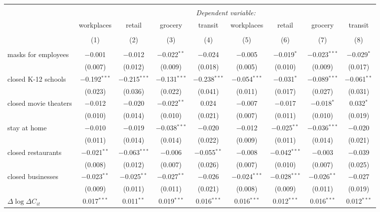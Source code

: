\begin{tabular}{@{\extracolsep{1pt}}lcccccccc} 
\\[-1.8ex]\hline 
\hline \\[-1.8ex] 
 & \multicolumn{8}{c}{\textit{Dependent variable:}} \\ 
\cline{2-9} 
 & workplaces & retail & grocery & transit & workplaces & retail & grocery & transit \\ 
\\[-1.8ex] & (1) & (2) & (3) & (4) & (5) & (6) & (7) & (8)\\ 
\hline \\[-1.8ex] 
 masks for employees & $-$0.001 & $-$0.012 & $-$0.022$^{**}$ & $-$0.024 & $-$0.005 & $-$0.019$^{*}$ & $-$0.023$^{***}$ & $-$0.029$^{*}$ \\ 
  & (0.007) & (0.012) & (0.009) & (0.018) & (0.005) & (0.010) & (0.009) & (0.017) \\ 
  closed K-12 schools & $-$0.192$^{***}$ & $-$0.215$^{***}$ & $-$0.131$^{***}$ & $-$0.238$^{***}$ & $-$0.054$^{***}$ & $-$0.031$^{*}$ & $-$0.089$^{***}$ & $-$0.061$^{**}$ \\ 
  & (0.023) & (0.036) & (0.022) & (0.041) & (0.011) & (0.017) & (0.027) & (0.031) \\ 
  closed movie theaters & $-$0.012 & $-$0.020 & $-$0.022$^{**}$ & 0.024 & $-$0.007 & $-$0.017 & $-$0.018$^{*}$ & 0.032$^{*}$ \\ 
  & (0.010) & (0.014) & (0.010) & (0.021) & (0.007) & (0.011) & (0.010) & (0.019) \\ 
  stay at home & $-$0.010 & $-$0.019 & $-$0.038$^{***}$ & $-$0.020 & $-$0.012 & $-$0.025$^{**}$ & $-$0.036$^{***}$ & $-$0.020 \\ 
  & (0.011) & (0.014) & (0.014) & (0.022) & (0.009) & (0.011) & (0.014) & (0.021) \\ 
  closed restaurants & $-$0.021$^{**}$ & $-$0.063$^{***}$ & $-$0.006 & $-$0.055$^{**}$ & $-$0.008 & $-$0.042$^{***}$ & $-$0.003 & $-$0.039 \\ 
  & (0.008) & (0.012) & (0.007) & (0.026) & (0.007) & (0.010) & (0.007) & (0.025) \\ 
  closed businesses & $-$0.023$^{**}$ & $-$0.025$^{**}$ & $-$0.027$^{**}$ & $-$0.026 & $-$0.024$^{***}$ & $-$0.028$^{***}$ & $-$0.026$^{**}$ & $-$0.027 \\ 
  & (0.009) & (0.011) & (0.011) & (0.021) & (0.008) & (0.009) & (0.011) & (0.019) \\ 
  $\Delta \log \Delta C_{it}$ & 0.017$^{***}$ & 0.011$^{**}$ & 0.019$^{***}$ & 0.016$^{***}$ & 0.016$^{***}$ & 0.012$^{***}$ & 0.016$^{***}$ & 0.012$^{***}$ \\ 

\end{tabular}
